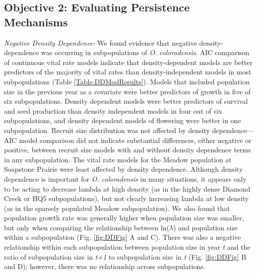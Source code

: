 \documentclass[12pt, letterpaper]{article}
\begin{document}
\subsection{Objective 2: Evaluating Persistence Mechanisms}

\textit{Negative Density Dependence:} We found evidence that negative density-dependence was occurring in subpopulations of \textit{O. coloradensis}. AIC comparison of continuous vital rate models indicate that density-dependent models are better predictors of the majority of vital rates than density-independent models in most subpopulations (Table \ref{Table:DDModResults}).  Models that included population size in the previous year as a covariate were better predictors of growth in five of six subpopulations. Density dependent models were better predictors of survival and seed production than density independent models in four out of six subpopulations, and density dependent models of flowering were better in one subpopulation. Recruit size distribution was not affected by density dependence—AIC model comparison did not indicate substantial differences, either negative or positive, between recruit size models with and without density dependence terms in any subpopulation. The vital rate models for the Meadow population at Soapstone Prairie were least affected by density dependence. Although density dependence is important for \textit{O. coloradensis} in many situations, it appears only to be acting to decrease lambda at high density (as in the highly dense Diamond Creek or HQ5 subpopulations), but not clearly increasing lambda at low density (as in the sparsely populated Meadow subpopulation). We also found that population growth rate was generally higher when population size was smaller, but only when comparing the relationship between ln($\lambda$) and population size within a subpopulation (Fig. \ref{fig:DDFig} A and C). There was also a negative relationship within each subpopulation between population size in year \textit{t} and the ratio of subpopulation size in \textit{t+1} to subpopulation size in \textit{t} (Fig. \ref{fig:DDFig} B and D); however, there was no relationship across subpopulations.  
\end{document}

